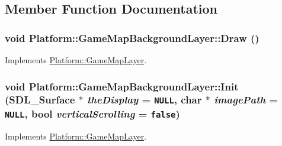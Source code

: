 \subsection{Member Function Documentation}
\hypertarget{class_platform_1_1_game_map_background_layer_f6910e7841ae5315baa5fd956202a982}{
\subsubsection[{Draw}]{\setlength{\rightskip}{0pt plus 5cm}void Platform::GameMapBackgroundLayer::Draw ()}}
\label{df/d72/class_platform_1_1_game_map_background_layer_f6910e7841ae5315baa5fd956202a982}




Implements \hyperlink{class_platform_1_1_game_map_layer_cc44f193d8cf01e97fe34cb7da72e640}{Platform::GameMapLayer}.\hypertarget{class_platform_1_1_game_map_background_layer_449a95c15187b1ae358a0216a589df3f}{
\subsubsection[{Init}]{\setlength{\rightskip}{0pt plus 5cm}void Platform::GameMapBackgroundLayer::Init (SDL\_\-Surface $\ast$ {\em theDisplay} = {\tt NULL}, \/  char $\ast$ {\em imagePath} = {\tt NULL}, \/  bool {\em verticalScrolling} = {\tt false})}}
\label{df/d72/class_platform_1_1_game_map_background_layer_449a95c15187b1ae358a0216a589df3f}




Implements \hyperlink{class_platform_1_1_game_map_layer_a25bd5a4d69574dfb3cefdd544e36e8d}{Platform::GameMapLayer}.